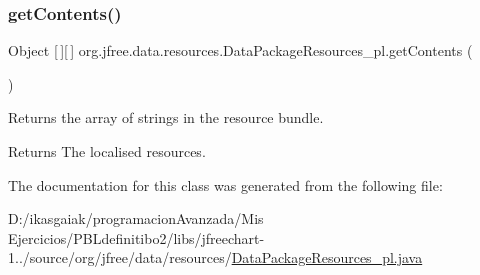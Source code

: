 \subsubsection{\texorpdfstring{get\+Contents()}{getContents()}}
{\footnotesize\ttfamily Object \mbox{[}$\,$\mbox{]}\mbox{[}$\,$\mbox{]} org.\+jfree.\+data.\+resources.\+Data\+Package\+Resources\+\_\+pl.\+get\+Contents (\begin{DoxyParamCaption}{ }\end{DoxyParamCaption})}

Returns the array of strings in the resource bundle.

\begin{DoxyReturn}{Returns}
The localised resources. 
\end{DoxyReturn}


The documentation for this class was generated from the following file\+:\begin{DoxyCompactItemize}
\item 
D\+:/ikasgaiak/programacion\+Avanzada/\+Mis Ejercicios/\+P\+B\+Ldefinitibo2/libs/jfreechart-\/1../source/org/jfree/data/resources/\mbox{\hyperlink{_data_package_resources__pl_8java}{Data\+Package\+Resources\+\_\+pl.\+java}}\end{DoxyCompactItemize}

